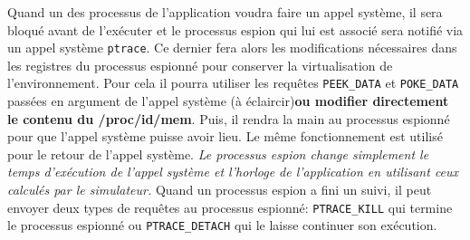 Quand un des processus de l'application voudra faire un appel système, il sera
bloqué avant de l'exécuter et le processus espion qui lui est associé sera
notifié via un appel système \texttt{ptrace}. Ce dernier fera alors les
modifications nécessaires dans les registres du processus espionné pour
conserver la virtualisation de l'environnement. Pour cela il pourra utiliser les
requêtes \texttt{PEEK\_DATA} et \texttt{POKE\_DATA} passées en argument de
l'appel système {\color{red} (à éclaircir)\textbf{ou modifier directement le
    contenu du /proc/id/mem}}. Puis, il rendra la main au processus espionné
pour que l'appel système puisse avoir lieu.%
 Le même fonctionnement est utilisé pour le retour de l'appel
 système. \textit{Le processus espion change simplement le temps d'exécution de
   l'appel système et l'horloge de l'application en utilisant ceux calculés par
   le simulateur.}  Quand un processus espion a fini un suivi, il peut envoyer
 deux types de requêtes au processus espionné: \texttt{PTRACE\_KILL} qui termine
 le processus espionné ou \texttt{PTRACE\_DETACH} qui le laisse continuer son
 exécution.

